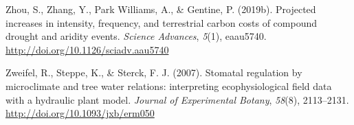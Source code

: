 \documentclass[11pt,twoside]{reedthesis}
\begin{document}
\hypertarget{ref-zhou_projected_2019}{}
Zhou, S., Zhang, Y., Park Williams, A., \& Gentine, P. (2019b).
Projected increases in intensity, frequency, and terrestrial carbon
costs of compound drought and aridity events. \emph{Science Advances},
\emph{5}(1), eaau5740. \url{http://doi.org/10.1126/sciadv.aau5740}

\hypertarget{ref-Zweifel2007}{}
Zweifel, R., Steppe, K., \& Sterck, F. J. (2007). Stomatal regulation by
microclimate and tree water relations: interpreting ecophysiological
field data with a hydraulic plant model. \emph{Journal of Experimental
Botany}, \emph{58}(8), 2113--2131.
\url{http://doi.org/10.1093/jxb/erm050}


\end{document}
